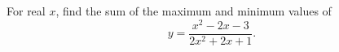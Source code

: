 For real $x$, find the sum of the maximum and minimum values of
\[
y=\dfrac{x^2-2x-3}{2x^2+2x+1}.
\]
